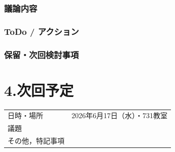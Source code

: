 \documentclass[a4paper,12pt]{ltjsarticle}
\begin{document}
\subsubsection*{議論内容}

\subsubsection*{ToDo / アクション}

\subsubsection*{保留・次回検討事項}

\section*{4.次回予定}
\begin{tabular}{ll}
  \toprule
  日時・場所 & 2026年6月17日（水）・731教室 \\
  議題       &  \\
  その他，特記事項 & \\
  \bottomrule
\end{tabular}
\end{document}
